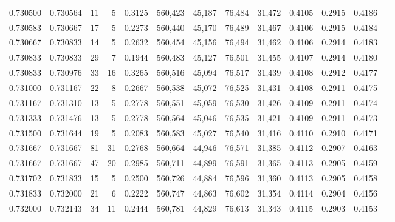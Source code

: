 \begin{tabular}{rrrrrrrrrrrrr}
0.730500 & 0.730564 &    11 &   5 &                                     0.3125 & 560,423 &  45,187 &  76,484 &  31,472 & 0.4105 & 0.2915 & 0.4186 \\
0.730583 & 0.730667 &    17 &   5 &                                     0.2273 & 560,440 &  45,170 &  76,489 &  31,467 & 0.4106 & 0.2915 & 0.4184 \\
0.730667 & 0.730833 &    14 &   5 &                                     0.2632 & 560,454 &  45,156 &  76,494 &  31,462 & 0.4106 & 0.2914 & 0.4183 \\
0.730833 & 0.730833 &    29 &   7 &                                     0.1944 & 560,483 &  45,127 &  76,501 &  31,455 & 0.4107 & 0.2914 & 0.4180 \\
0.730833 & 0.730976 &    33 &  16 &                                     0.3265 & 560,516 &  45,094 &  76,517 &  31,439 & 0.4108 & 0.2912 & 0.4177 \\
0.731000 & 0.731167 &    22 &   8 &                                     0.2667 & 560,538 &  45,072 &  76,525 &  31,431 & 0.4108 & 0.2911 & 0.4175 \\
0.731167 & 0.731310 &    13 &   5 &                                     0.2778 & 560,551 &  45,059 &  76,530 &  31,426 & 0.4109 & 0.2911 & 0.4174 \\
0.731333 & 0.731476 &    13 &   5 &                                     0.2778 & 560,564 &  45,046 &  76,535 &  31,421 & 0.4109 & 0.2911 & 0.4173 \\
0.731500 & 0.731644 &    19 &   5 &                                     0.2083 & 560,583 &  45,027 &  76,540 &  31,416 & 0.4110 & 0.2910 & 0.4171 \\
0.731667 & 0.731667 &    81 &  31 &                                     0.2768 & 560,664 &  44,946 &  76,571 &  31,385 & 0.4112 & 0.2907 & 0.4163 \\
0.731667 & 0.731667 &    47 &  20 &                                     0.2985 & 560,711 &  44,899 &  76,591 &  31,365 & 0.4113 & 0.2905 & 0.4159 \\
0.731702 & 0.731833 &    15 &   5 &                                     0.2500 & 560,726 &  44,884 &  76,596 &  31,360 & 0.4113 & 0.2905 & 0.4158 \\
0.731833 & 0.732000 &    21 &   6 &                                     0.2222 & 560,747 &  44,863 &  76,602 &  31,354 & 0.4114 & 0.2904 & 0.4156 \\
0.732000 & 0.732143 &    34 &  11 &                                     0.2444 & 560,781 &  44,829 &  76,613 &  31,343 & 0.4115 & 0.2903 & 0.4153 \\

\end{tabular}
